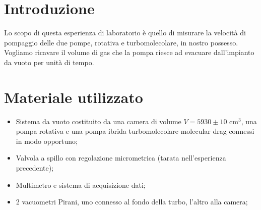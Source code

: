 \section{Introduzione}

Lo scopo di questa esperienza di laboratorio è quello di misurare la velocità di pompaggio delle due pompe, rotativa e turbomolecolare, in nostro possesso. Vogliamo ricavare il volume di gas che la pompa riesce ad evacuare dall'impianto da vuoto per unità di tempo.

\section{Materiale utilizzato}

\begin{itemize}
	\item{Sistema da vuoto costituito da una camera di volume $V = 5930 \pm 10$ \si{\centi\metre}$^3$, una pompa rotativa e una pompa ibrida turbomolecolare-molecular drag connessi in modo opportuno;}
    \item{Valvola a spillo con regolazione micrometrica (tarata nell'esperienza precedente);}
	\item{Multimetro e sistema di acquisizione dati;}
	\item{2 vacuometri Pirani, uno connesso al fondo della turbo, l'altro alla camera;}
\end{itemize}
